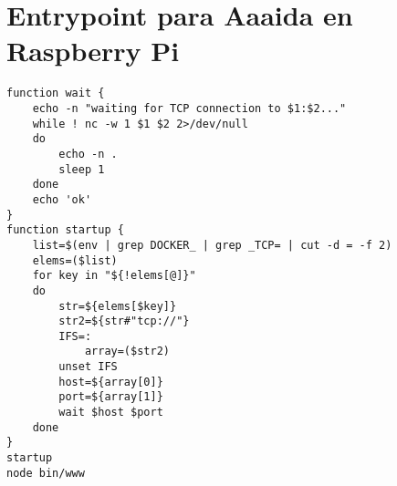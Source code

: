 \chapter{Entrypoint para Aaaida en Raspberry Pi}

\begin{verbatim}
function wait {
    echo -n "waiting for TCP connection to $1:$2..."
    while ! nc -w 1 $1 $2 2>/dev/null
    do
        echo -n .
        sleep 1
    done
    echo 'ok'
}
function startup {
    list=$(env | grep DOCKER_ | grep _TCP= | cut -d = -f 2)
    elems=($list)
    for key in "${!elems[@]}"
    do
        str=${elems[$key]}
        str2=${str#"tcp://"}
        IFS=:
            array=($str2)
        unset IFS
        host=${array[0]}
        port=${array[1]}
        wait $host $port
    done
}
startup
node bin/www
\end{verbatim}
